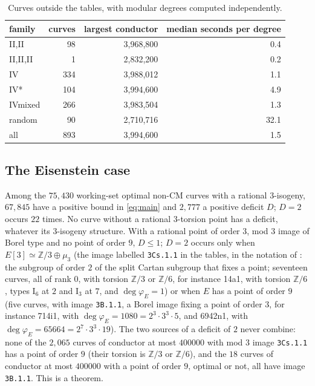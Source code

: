 \documentclass[11pt]{amsart}
\theoremstyle{definition}
\newcommand{\Z}{\mathbb{Z}}
\newcommand{\degphi}{\deg\varphi_E}
\begin{document}
\begin{table}[ht]
\centering\small
{\small
\begin{tabular}{lrrr}
\hline
family & curves & largest conductor & median seconds per degree \\
\hline
II,II & 98 & 3,968,800 & 0.4 \\
II,II,II & 1 & 2,832,200 & 0.2 \\
IV & 334 & 3,988,012 & 1.1 \\
IV* & 104 & 3,994,600 & 4.9 \\
IVmixed & 266 & 3,983,504 & 1.3 \\
random & 90 & 2,710,716 & 32.1 \\
all & 893 & 3,994,600 & 1.5 \\
\hline
\end{tabular}
}
\caption{Curves outside the tables, with modular degrees computed independently.}\label{tab:oot}
\end{table}

\subsection{The Eisenstein case}\label{sec:eis}
Among the $75{,}430$ working-set optimal non-CM curves with a rational $3$-isogeny, $67{,}845$ have a positive bound in \eqref{eq:main} and $2{,}777$ a positive deficit $D$; $D=2$ occurs $22$ times. No curve without a rational $3$-torsion point has a deficit, whatever its $3$-isogeny structure. With a rational point of order $3$, mod $3$ image of Borel type and no point of order $9$, $D\le1$; $D=2$ occurs only when $E[3]\simeq\Z/3\oplus\mu_3$ (the image labelled \texttt{3Cs.1.1} in the tables, in the notation of \cite{Sutherland16}: the subgroup of order $2$ of the split Cartan subgroup that fixes a point; seventeen curves, all of rank $0$, with torsion $\Z/3$ or $\Z/6$, for instance 14a1, with torsion $\Z/6$, types $\mathrm{I}_6$ at $2$ and $\mathrm{I}_3$ at $7$, and $\degphi=1$) or when $E$ has a point of order $9$ (five curves, with image \texttt{3B.1.1}, a Borel image fixing a point of order $3$, for instance 714i1, with $\degphi=1080=2^3\cdot3^3\cdot5$, and 6942n1, with $\degphi=65664=2^7\cdot3^3\cdot19$). The two sources of a deficit of $2$ never combine: none of the $2{,}065$ curves of conductor at most $400000$ with mod $3$ image \texttt{3Cs.1.1} has a point of order $9$ (their torsion is $\Z/3$ or $\Z/6$), and the $18$ curves of conductor at most $400000$ with a point of order $9$, optimal or not, all have image \texttt{3B.1.1}. This is a theorem.
\end{document}
